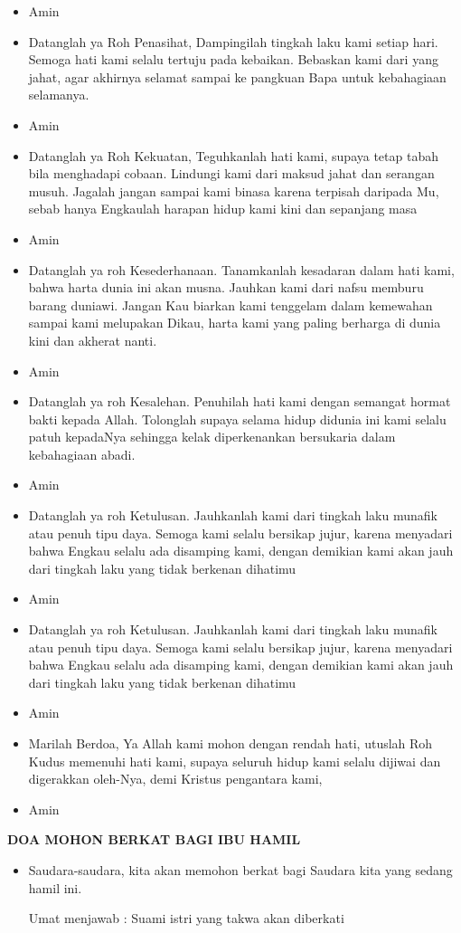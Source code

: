 \documentclass[a5paper,headsepline,titlepage,10pt,nnormalheadings,DIVcalc,twoside]{scrbook}
\makeatletter
\newcommand{\subjudul}[1]{%
  {\parindent \z@ 
    \interlinepenalty\@M \bfseries #1\par\nobreak \vskip 10\p@ }}
\newcommand{\BU}[1]{\begin{itemize} \item[U:] #1 \end{itemize}}
\newcommand{\BP}[1]{\begin{itemize} \item[P:] #1 \end{itemize}}
\makeatother
\begin{document}
\BU{Amin}

\BP{Datanglah ya Roh Penasihat, Dampingilah tingkah laku kami setiap hari. Semoga hati kami selalu tertuju pada kebaikan. Bebaskan kami dari yang jahat, agar akhirnya selamat sampai ke pangkuan Bapa untuk kebahagiaan selamanya.}

\BU{Amin}

\BP{Datanglah ya Roh Kekuatan, Teguhkanlah hati kami, supaya tetap tabah bila menghadapi cobaan. Lindungi kami dari maksud jahat dan serangan musuh. Jagalah jangan sampai kami binasa karena terpisah daripada Mu, sebab hanya Engkaulah harapan hidup kami kini dan sepanjang masa}

\BU{Amin}

\BP{Datanglah ya roh Kesederhanaan. Tanamkanlah kesadaran dalam hati kami, bahwa harta dunia ini akan musna. Jauhkan kami dari nafsu memburu barang duniawi. Jangan Kau biarkan kami tenggelam dalam kemewahan sampai kami melupakan Dikau, harta kami yang paling berharga di dunia kini dan akherat nanti.}

\BU{Amin}

\BP{Datanglah ya roh Kesalehan. Penuhilah hati kami dengan semangat hormat bakti kepada Allah. Tolonglah supaya selama hidup didunia ini kami selalu patuh kepadaNya sehingga kelak diperkenankan bersukaria dalam kebahagiaan abadi.}

\BU{Amin}

\BP{Datanglah ya roh Ketulusan. Jauhkanlah kami dari tingkah laku munafik atau penuh tipu daya. Semoga kami selalu bersikap jujur, karena menyadari bahwa Engkau selalu ada disamping kami, dengan demikian kami akan jauh dari tingkah laku yang tidak berkenan dihatimu}

\BU{Amin}

\BP{Datanglah ya roh Ketulusan. Jauhkanlah kami dari tingkah laku munafik atau penuh tipu daya. Semoga kami selalu bersikap jujur, karena menyadari bahwa Engkau selalu ada disamping kami, dengan demikian kami akan jauh dari tingkah laku yang tidak berkenan dihatimu}

\BU{Amin}

\BP{Marilah Berdoa, Ya Allah kami mohon dengan rendah hati, utuslah Roh Kudus memenuhi hati kami, supaya seluruh hidup kami selalu dijiwai dan digerakkan oleh-Nya, demi Kristus pengantara kami,}

\BU{Amin}

\subjudul{DOA MOHON BERKAT BAGI IBU HAMIL}
\BP{Saudara-saudara, kita akan memohon berkat bagi Saudara kita yang sedang hamil ini.

Umat menjawab : Suami istri yang takwa akan diberkati}
\end{document}
